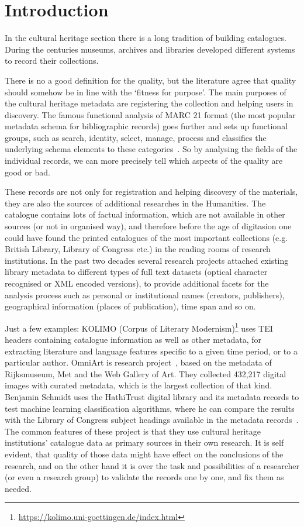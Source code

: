\chapter{Introduction}

In the cultural heritage section there is a long tradition of building catalogues. During the centuries museums, archives and libraries developed different systems to record their collections.

There is no a good definition for the quality, but the literature agree that quality should somehow be in line with the `fitness for purpose'. The main purposes of the cultural heritage metadata are registering the collection and helping users in discovery. The famous functional analysis of MARC 21 format (the most popular metadata  schema for bibliographic records) goes further and sets up functional groups, such as search, identity, select, manage, process and classifies the underlying schema elements to these categories~\cite{frbr1998, loc2006}. So by analysing the fields of the individual records, we can more precisely tell which aspects of the quality are good or bad.

These records are not only for registration and helping discovery of the materials, they are also the sources of additional researches in the Humanities. The catalogue contains lots of factual information, which are not available in other sources (or not in organised way), and therefore before the age of digitasion one could have found the printed catalogues of the most important collections (e.g. British Library, Library of Congress etc.) in the reading rooms of research institutions. In the past two decades several research projects attached existing library metadata to different types of full text datasets (optical character recognised or XML encoded versions), to provide additional facets for the analysis process such as personal or institutional names (creators, publishers), geographical information (places of publication), time span and so on.

Just a few examples: KOLIMO (Corpus of Literary Modernism)\footnote{\url{https://kolimo.uni-goettingen.de/index.html}} uses TEI headers containing catalogue information as well as other metadata, for extracting literature and language features specific to a given time period, or to a particular author. OmniArt is research project~\cite{strezoski2017}, based on the metadata of Rijksmuseum, Met and the Web Gallery of Art. They collected 432,217 digital images with curated metadata, which is the largest collection of that kind. Benjamin Schmidt uses the HathiTrust digital library and its metadata records to test machine learning classification algorithms, where he can compare the results with the Library of Congress subject headings available in the metadata records~\cite{smith2017}. The common features of these project is that they use cultural heritage institutions’ catalogue data as primary sources in their own research. It is self evident, that quality of those data might have effect on the conclusions of the research, and on the other hand it is over the task and possibilities of a researcher (or even a research group) to validate the records one by one, and fix them as needed.


